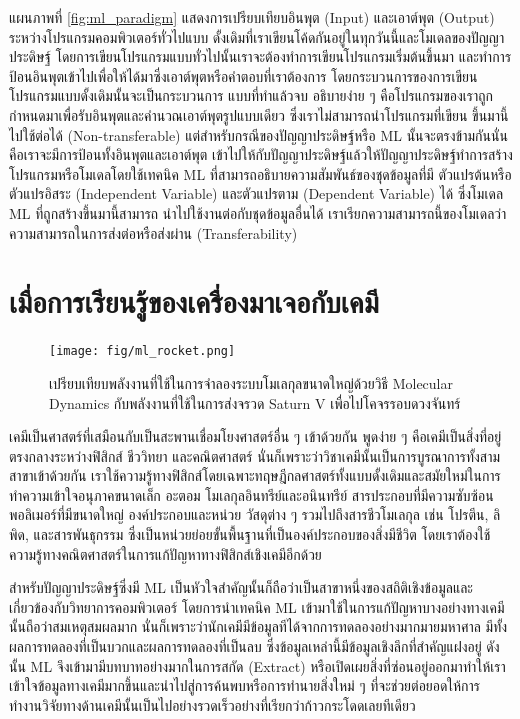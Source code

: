 แผนภาพที่ \ref{fig:ml_paradigm} แสดงการเปรียบเทียบอินพุต (Input) และเอาต์พุต (Output) ระหว่างโปรแกรมคอมพิวเตอร์ทั่วไปแบบ%
ดั้งเดิมที่เราเขียนโค้ดกันอยู่ในทุกวันนี้และโมเดลของปัญญาประดิษฐ์ โดยการเขียนโปรแกรมแบบทั่วไปนั้นเราจะต้องทำการเขียนโปรแกรมเริ่มต้นขึ้นมา%
และทำการป้อนอินพุตเข้าไปเพื่อให้ได้มาซึ่งเอาต์พุตหรือคำตอบที่เราต้องการ โดยกระบวนการของการเขียนโปรแกรมแบบดั้งเดิมนั้นจะเป็นกระบวนการ%
แบบที่ทำแล้วจบ อธิบายง่าย ๆ คือโปรแกรมของเราถูกกำหนดมาเพื่อรับอินพุตและคำนวณเอาต์พุตรูปแบบเดียว ซึ่งเราไม่สามารถนำโปรแกรมที่เขียน%
ขึ้นมานี้ไปใช้ต่อได้ (Non-transferable) แต่สำหรับกรณีของปัญญาประดิษฐ์หรือ ML นั้นจะตรงข้ามกันนั่นคือเราจะมีการป้อนทั้งอินพุตและเอาต์พุต%
เข้าไปให้กับปัญญาประดิษฐ์แล้วให้ปัญญาประดิษฐ์ทำการสร้างโปรแกรมหรือโมเดลโดยใช้เทคนิค ML ที่สามารถอธิบายความสัมพันธ์ของชุดข้อมูลที่มี%
ตัวแปรต้นหรือตัวแปรอิสระ (Independent Variable) และตัวแปรตาม (Dependent Variable) ได้ ซึ่งโมเดล ML ที่ถูกสร้างขึ้นมานี้สามารถ%
นำไปใช้งานต่อกับชุดข้อมูลอื่นได้ เราเรียกความสามารถนี้ของโมเดลว่าความสามารถในการส่งต่อหรือส่งผ่าน (Transferability)

\section{เมื่อการเรียนรู้ของเครื่องมาเจอกับเคมี}
\label{sec:ml_meets_chem}

\begin{figure}[htbp]
    \centering
    \texttt{[image: fig/ml\_rocket.png]}
    \caption{เปรียบเทียบพลังงานที่ใช้ในการจำลองระบบโมเลกุลขนาดใหญ่ด้วยวิธี Molecular Dynamics กับพลังงานที่ใช้ในการส่งจรวด 
    Saturn V เพื่อไปโคจรรอบดวงจันทร์}
    \label{fig:ml_rocket}
\end{figure}

เคมีเป็นศาสตร์ที่เสมือนกับเป็นสะพานเชื่อมโยงศาสตร์อื่น ๆ เข้าด้วยกัน พูดง่าย ๆ คือเคมีเป็นสิ่งที่อยู่ตรงกลางระหว่างฟิสิกส์ ชีววิทยา และคณิตศาสตร์
นั่นก็เพราะว่าวิชาเคมีนั้นเป็นการบูรณาการทั้งสามสาขาเข้าด้วยกัน เราใช้ความรู้ทางฟิสิกส์โดยเฉพาะทฤษฎีกลศาสตร์ทั้งแบบดั้งเดิมและสมัยใหม่ในการ%
ทำความเข้าใจอนุภาคขนาดเล็ก อะตอม โมเลกุลอินทรีย์และอนินทรีย์ สารประกอบที่มีความซับซ้อน พอลิเมอร์ที่มีขนาดใหญ่ องค์ประกอบและหน่วย%
วัสดุต่าง ๆ รวมไปถึงสารชีวโมเลกุล เช่น โปรตีน, ลิพิด, และสารพันธุกรรม ซึ่งเป็นหน่วยย่อยขั้นพื้นฐานที่เป็นองค์ประกอบของสิ่งมีชีวิต 
โดยเราต้องใช้ความรู้ทางคณิตศาสตร์ในการแก้ปัญหาทางฟิสิกส์เชิงเคมีอีกด้วย

สำหรับปัญญาประดิษฐ์ซึ่งมี ML เป็นหัวใจสำคัญนั้นก็ถือว่าเป็นสาขาหนึ่งของสถิติเชิงข้อมูลและเกี่ยวข้องกับวิทยาการคอมพิวเตอร์ โดยการนำเทคนิค 
ML เข้ามาใช้ในการแก้ปัญหาบางอย่างทางเคมีนั้นถือว่าสมเหตุสมผลมาก นั่นก็เพราะว่านักเคมีมีข้อมูลทีได้จากการทดลองอย่างมากมายมหาศาล 
มีทั้งผลการทดลองที่เป็นบวกและผลการทดลองที่เป็นลบ ซึ่งข้อมูลเหล่านี้มีข้อมูลเชิงลึกที่สำคัญแฝงอยู่ ดังนั้น ML จึงเข้ามามีบทบาทอย่างมากในการสกัด 
(Extract) หรือเปิดเผยสิ่งที่ซ่อนอยู่ออกมาทำให้เราเข้าใจข้อมูลทางเคมีมากขึ้นและนำไปสู่การค้นพบหรือการทำนายสิ่งใหม่ ๆ ที่จะช่วยต่อยอดให้การ%
ทำงานวิจัยทางด้านเคมีนั้นเป็นไปอย่างรวดเร็วอย่างที่เรียกว่าก้าวกระโดดเลยทีเดียว\autocite{cartwright2020,zotero-817}

